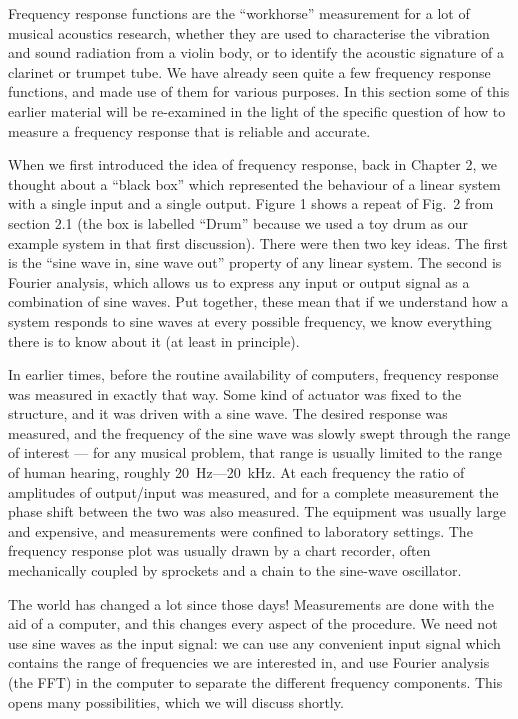 

  Frequency response functions are the “workhorse” measurement for a lot of 
  musical acoustics research, whether they are used to characterise the 
  vibration and sound radiation from a violin body, or to identify the acoustic 
  signature of a clarinet or trumpet tube. We have already seen quite a few 
  frequency response functions, and made use of them for various purposes. In 
  this section some of this earlier material will be re-examined in the light 
  of the specific question of how to measure a frequency response that is 
  reliable and accurate. 

  When we first introduced the idea of frequency response, back in Chapter 2, 
  we thought about a “black box” which represented the behaviour of a linear 
  system with a single input and a single output. Figure 1 shows a repeat of 
  Fig.\ 2 from section 2.1 (the box is labelled “Drum” because we used a toy 
  drum as our example system in that first discussion). There were then two key 
  ideas. The first is the “sine wave in, sine wave out” property of any linear 
  system. The second is Fourier analysis, which allows us to express any input 
  or output signal as a combination of sine waves. Put together, these mean 
  that if we understand how a system responds to sine waves at every possible 
  frequency, we know everything there is to know about it (at least in 
  principle). 

  In earlier times, before the routine availability of computers, frequency 
  response was measured in exactly that way. Some kind of actuator was fixed to 
  the structure, and it was driven with a sine wave. The desired response was 
  measured, and the frequency of the sine wave was slowly swept through the 
  range of interest — for any musical problem, that range is usually limited to 
  the range of human hearing, roughly 20~Hz—20~kHz. At each frequency the ratio 
  of amplitudes of output/input was measured, and for a complete measurement 
  the phase shift between the two was also measured. The equipment was usually 
  large and expensive, and measurements were confined to laboratory settings. 
  The frequency response plot was usually drawn by a chart recorder, often 
  mechanically coupled by sprockets and a chain to the sine-wave oscillator. 

  The world has changed a lot since those days! Measurements are done with the 
  aid of a computer, and this changes every aspect of the procedure. We need 
  not use sine waves as the input signal: we can use any convenient input 
  signal which contains the range of frequencies we are interested in, and use 
  Fourier analysis (the FFT) in the computer to separate the different 
  frequency components. This opens many possibilities, which we will discuss 
  shortly. 

